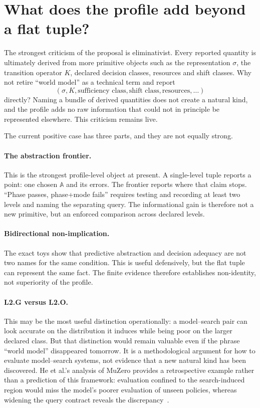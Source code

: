 \documentclass[10pt]{article}
\newcommand{\Aabs}{\mathbb A}
\begin{document}
\section{What does the profile add beyond a flat tuple?}

The strongest criticism of the proposal is eliminativist. Every reported quantity is ultimately derived from more primitive objects such as the representation $\sigma$, the transition operator $K$, declared decision classes, resources and shift classes. Why not retire ``world model'' as a technical term and report
\[
(\sigma,K,\text{sufficiency class},\text{shift class},\text{resources},\ldots)
\]
directly? Naming a bundle of derived quantities does not create a natural kind, and the profile adds no raw information that could not in principle be represented elsewhere. This criticism remains live.

The current positive case has three parts, and they are not equally strong.

\paragraph{The abstraction frontier.}
This is the strongest profile-level object at present. A single-level tuple reports a point: one chosen $\Aabs$ and its errors. The frontier reports where that claim stops. ``Phase passes, phase+mode fails'' requires testing and recording at least two levels and naming the separating query. The informational gain is therefore not a new primitive, but an enforced comparison across declared levels.

\paragraph{Bidirectional non-implication.}
The exact toys show that predictive abstraction and decision adequacy are not two names for the same condition. This is useful defensively, but the flat tuple can represent the same fact. The finite evidence therefore establishes non-identity, not superiority of the profile.

\paragraph{L2.G versus L2.O.}
This may be the most useful distinction operationally: a model--search pair can look accurate on the distribution it induces while being poor on the larger declared class. But that distinction would remain valuable even if the phrase ``world model'' disappeared tomorrow. It is a methodological argument for how to evaluate model--search systems, not evidence that a new natural kind has been discovered. He et al.'s analysis of MuZero provides a retrospective example rather than a prediction of this framework: evaluation confined to the search-induced region would miss the model's poorer evaluation of unseen policies, whereas widening the query contract reveals the discrepancy~\cite{he2024}.
\end{document}

